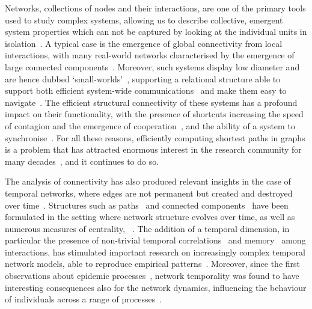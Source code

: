 \documentclass[a4paper,pre,reqno,superscriptaddress, twocolumn, floatfix]{revtex4}
\begin{document}
Networks, collections of nodes and their interactions, are one of the primary tools used to study complex systems, allowing us to describe collective, emergent system properties which can not be captured by looking at the individual units in isolation~\cite{newman2018networks}.
A typical case is the emergence of global connectivity from local interactions, with many real-world networks characterised by the emergence of large connected components~\cite{molloy1995critical}. 
Moreover, such systems display low diameter and are hence dubbed `small-worlds'~\cite{wattsstrogatz1998smallworld}, supporting a relational structure able to support both efficient system-wide communications~\cite{latora2001efficient, estrada2008communicability} and make them easy to navigate~\cite{kleinberg2000navigation}.
The efficient structural connectivity of these systems has a profound impact on their functionality, with the presence of shortcuts increasing the speed of contagion and the emergence of cooperation~\cite{santos2005epidemic}, and the ability of a system to synchronise~\cite{barahona2002synchronization}.
For all these reasons, efficiently computing shortest paths in graphs is a problem that has attracted enormous interest in the research community for many decades~\cite{dijkstra2022note}, and it continues to do so.

The analysis of connectivity has also produced relevant insights in the case of temporal networks, where edges are not permanent but created and destroyed over time~\cite{holme2012temporal}. 
Structures such as paths~\cite{wu2014path} and connected components~\cite{nicosia2012components} have been formulated in the setting where network structure evolves over time, as well as numerous measures of centrality, ~\cite{nicosia2013graphmetrics}.
 The addition of a temporal dimension, in particular the presence of non-trivial temporal correlations~\cite{karsai2012universal} and memory~\cite{williams2022shape} among interactions, has stimulated important research on increasingly complex temporal network models, able to reproduce empirical patterns~\cite{perra2012activity, lacasa2022correlations, williams2022non}.
Moreover, since the first observations about epidemic processes~\cite{karsai2011small, rocha2011simulated}, network temporality was found to have interesting consequences also for the network dynamics, influencing the behaviour of individuals across a range of processes~\cite{scholtes2014causality, starnini2017equivalence}.  
\end{document}
